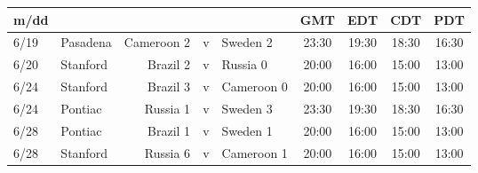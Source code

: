 \begin{figure}[H]
\begin{tabular}{l l r c l c c c c}
m/dd  & & & & & GMT & EDT & CDT & PDT \\ \hline
6/19 & Pasadena & Cameroon 2 & v & Sweden 2 & 23:30 & 19:30 & 18:30 & 16:30 \\
6/20 & Stanford & Brazil 2 & v & Russia 0 & 20:00 &16:00 & 15:00 & 13:00 \\
6/24 & Stanford & Brazil 3 & v & Cameroon 0 & 20:00 &16:00 & 15:00 & 13:00 \\
6/24 & Pontiac & Russia 1 & v & Sweden 3 & 23:30 & 19:30 & 18:30 & 16:30 \\
6/28 & Pontiac & Brazil 1 & v & Sweden 1 & 20:00 &16:00 & 15:00 & 13:00 \\
6/28 & Stanford & Russia 6 & v & Cameroon 1 & 20:00 &16:00 & 15:00 & 13:00 \\ \hline
\end{tabular}
\end{figure}

